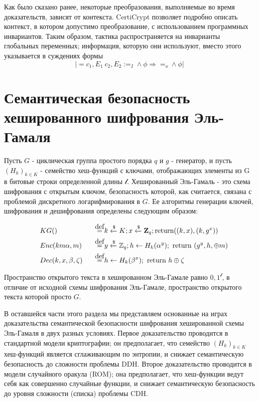 \documentclass[a4paper,12pt]{report}
\newcommand\myeq{\stackrel{\mathclap{\normalfont\mbox{def}}}{=}}
\begin{document}
Как было сказано ранее, некоторые преобразования, выполняемые во время доказательств, зависят от контекста. CertiCrypt позволяет подробно описать контекст, в котором допустимо преобразование, с использованием программных инвариантов. Таким образом, тактика распространяется на инварианты глобальных переменных; информация, которую они используют, вместо этого указывается в суждениях формы
\begin{equation*}
    |= c_1, E_1 ~ c_2, E_2 :=_{I} \wedge\phi \Rightarrow =_o \wedge \phi|
\end{equation*}

\chapter{Семантическая безопасность хешированного шифрования Эль-Гамаля}

Пусть $G$ - циклическая группа простого порядка $q$ и $g$ - генератор, и пусть $(H_k)_{k \in K}$ - семейство хеш-функций с ключами, отображающих элементы из G в битовые строки определенной длины $\mathcal{l}$. Хешированный Эль-Гамаль - это схема шифрования с открытым ключом, безопасность которой, как считается, связана с проблемой дискретного логарифмирования в $G$. Ее алгоритмы генерации ключей, шифрования и дешифрования определены следующим образом:

\begin{align*}
    &\mathrel{\phantom{=}}KG() & &\mathrel{\phantom{=}} \myeq k \xleftarrow{\$} K; x \xleftarrow{\$} \textbf{Z}_q; \text{return} ((k, x), (k, g^x))\\
    &\mathrel{\phantom{=}}Enc(km \alpha, m) & &\mathrel{\phantom{=}} \myeq y \xleftarrow{\$} \mathbb{Z}_q; h \gets H_k(\alpha^y); \text{ return } (g^y, h, \oplus m) \\
    &\mathrel{\phantom{=}}Dec(k,x,\beta,\zeta) & &\mathrel{\phantom{=}} \myeq h \gets H_k(\beta^x); \text{ return } h \oplus \zeta
\end{align*}

Пространство открытого текста в хешированном Эль-Гамале равно ${0, 1}^{\mathcal{l}}$, в отличие от исходной схемы шифрования Эль-Гамале, пространство открытого текста которой просто $G$. 

В оставшейся части этого раздела мы представляем основанные на играх доказательства семантической безопасности шифрования хешированной схемы Эль-Гамаля в двух разных условиях. Первое доказательство проводится в стандартной модели криптографии; он предполагает, что семейство $(H_k)_{k \in K}$ хеш-функций является сглаживающим по энтропии, и снижает семантическую безопасность до сложности проблемы DDH. Второе доказательство проводится в модели случайного оракула (ROM); она предполагает, что хеш-функции ведут себя как совершенно случайные функции, и снижает семантическую безопасность до уровня сложности (списка) проблемы CDH.
\end{document}
